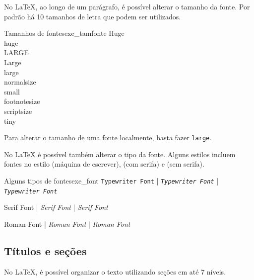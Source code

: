 No \LaTeX{}, ao longo de um parágrafo, é possível alterar o tamanho da fonte. Por padrão há 10 tamanhos de letra que podem ser utilizados.

\begin{texexptitled}[breakable,center lower,enhanced,middle=2mm,listing side text]{Tamanhos de fontes}{exe_tamfonte}
\Huge Huge \\
\huge huge \\
\LARGE LARGE \\
\Large Large \\
\large large \\
\normalsize normalsize \\
\small small \\
\footnotesize footnotesize \\
\scriptsize scriptsize \\
\tiny tiny
\end{texexptitled}

Para alterar o tamanho de uma fonte localmente, basta fazer \texttt{\large large}.

No \LaTeX{} é possível também alterar o tipo da fonte. Alguns estilos incluem fontes no estilo \texttt{\texttt{}} (máquina de escrever), \texttt{\textsf{}} (com serifa) e \texttt{\textrm{}} (sem serifa).

\begin{texexptitled}[breakable,center lower,enhanced,middle=2mm]{Alguns tipos de fontes}{exe_font}
\texttt{Typewriter Font} | 
\texttt{\textit{Typewriter Font}} |
\texttt{\textsl{Typewriter Font}}

\textsf{Serif Font} | 
\textsf{\textit{Serif Font}} | 
\textsf{\textsl{Serif Font}}

\textrm{Roman Font} | 
\textrm{\textit{Roman Font}} | 
\textrm{\textsl{Roman Font}}
\end{texexptitled}

\subsection{Títulos e seções}
\label{sec:tit_secs}

No \LaTeX{}, é possível organizar o texto utilizando seções em até 7 níveis.

